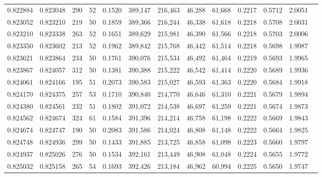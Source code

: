 \begin{tabular}{rrrrrrrrrrrrr}
0.822884 & 0.823048 &   290 &  52 &                                     0.1520 & 389,147 & 216,463 &  46,288 &  61,668 & 0.2217 & 0.5712 & 2.0051 \\
0.823052 & 0.823210 &   219 &  50 &                                     0.1859 & 389,366 & 216,244 &  46,338 &  61,618 & 0.2218 & 0.5708 & 2.0031 \\
0.823210 & 0.823338 &   263 &  52 &                                     0.1651 & 389,629 & 215,981 &  46,390 &  61,566 & 0.2218 & 0.5703 & 2.0006 \\
0.823350 & 0.823602 &   213 &  52 &                                     0.1962 & 389,842 & 215,768 &  46,442 &  61,514 & 0.2218 & 0.5698 & 1.9987 \\
0.823621 & 0.823864 &   234 &  50 &                                     0.1761 & 390,076 & 215,534 &  46,492 &  61,464 & 0.2219 & 0.5693 & 1.9965 \\
0.823867 & 0.824057 &   312 &  50 &                                     0.1381 & 390,388 & 215,222 &  46,542 &  61,414 & 0.2220 & 0.5689 & 1.9936 \\
0.824061 & 0.824166 &   195 &  51 &                                     0.2073 & 390,583 & 215,027 &  46,593 &  61,363 & 0.2220 & 0.5684 & 1.9918 \\
0.824170 & 0.824375 &   257 &  53 &                                     0.1710 & 390,840 & 214,770 &  46,646 &  61,310 & 0.2221 & 0.5679 & 1.9894 \\
0.824380 & 0.824561 &   232 &  51 &                                     0.1802 & 391,072 & 214,538 &  46,697 &  61,259 & 0.2221 & 0.5674 & 1.9873 \\
0.824562 & 0.824674 &   324 &  61 &                                     0.1584 & 391,396 & 214,214 &  46,758 &  61,198 & 0.2222 & 0.5669 & 1.9843 \\
0.824674 & 0.824747 &   190 &  50 &                                     0.2083 & 391,586 & 214,024 &  46,808 &  61,148 & 0.2222 & 0.5664 & 1.9825 \\
0.824748 & 0.824936 &   299 &  50 &                                     0.1433 & 391,885 & 213,725 &  46,858 &  61,098 & 0.2223 & 0.5660 & 1.9797 \\
0.824937 & 0.825026 &   276 &  50 &                                     0.1534 & 392,161 & 213,449 &  46,908 &  61,048 & 0.2224 & 0.5655 & 1.9772 \\
0.825032 & 0.825158 &   265 &  54 &                                     0.1693 & 392,426 & 213,184 &  46,962 &  60,994 & 0.2225 & 0.5650 & 1.9747 \\

\end{tabular}
